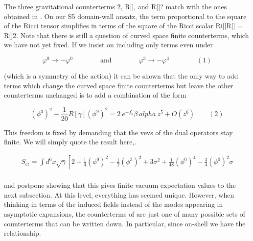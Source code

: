 \documentclass{article}
\begin{document}
\sloppy

The three gravitational counterterms 2, R[], and R[]? match with the ones obtained
in . On our S5 domain-wall ansatz, the term proportional to the square of the Ricci tensor
simplifies in terms of the square of the Ricci scalar Ri[]R[] = R[]2. Note that there is
still a question of curved space finite counterterms, which we have not yet fixed. If we insist
on including only terms even under


\begin{equation}
\varphi ^ { 0 } \rightarrow - \varphi ^ { 0 } \qquad \qquad \mathrm { a n d } \qquad \qquad \varphi ^ { 3 } \rightarrow - \varphi ^ { 3 } \qquad \qquad ( 1 )
\end{equation}


(which is a symmetry of the action) it can be shown that the only way to add terms which
change the curved space finite counterterms but leave the other counterterms unchanged is
to add a combination of the form


\begin{equation}
( \phi ^ { 3 } ) ^ { 2 } - \frac { 1 } { 2 0 } R [ \gamma ] ( \phi ^ { 9 } ) ^ { 2 } = 2 ~ e ^ { - f _ { k } } \beta ~ a l p h a ~ z ^ { 5 } + O ( z ^ { 6 } ) \qquad ( 2 )
\end{equation}


This freedom is fixed by demanding that the vevs of the dual operators stay finite. We will
simply quote the result here,.


\begin{equation}
\begin{array} { c } { S _ { \mathrm { c t } } = \int d ^ { 6 } x \sqrt { \gamma } \left [ 2 + \frac { 1 } { 4 } \left ( \phi ^ { 0 } \right ) ^ { 2 } - \frac { 1 } { 2 } \left ( \phi ^ { 3 } \right ) ^ { 2 } + 3 \sigma ^ { 2 } + \frac { 1 } { 4 8 } \left ( \phi ^ { 0 } \right ) ^ { 4 } - \frac { 3 } { 4 } \left ( \phi ^ { 0 } \right ) ^ { 2 } \sigma \right. } \\ { ~ }\end{array}
\end{equation}


and postpone showing that this gives finite vacuum expectation values to the next subsection.
At this level, everything has seemed unique. However, when thinking in terms of the induced
fields instead of the modes appearing in asymptotic expansions, the counterterms of are just
one of many possible sets of counterterms that can be written down. In particular, since
on-shell we have the relationship.
\end{document}
